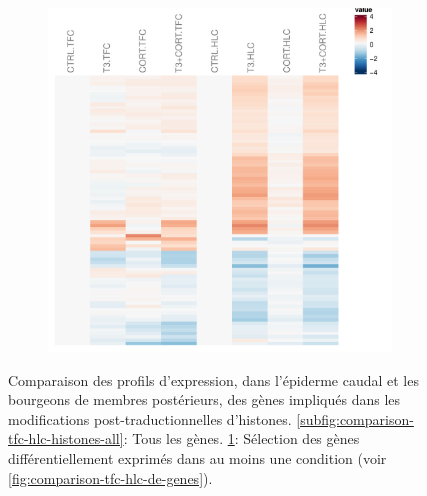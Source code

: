 \begin{figure}[!htbp]
\begin{subfigure}{0.495\textwidth}
	\includegraphics[width=\textwidth]
	{Figures/comparison-tfc-hlc-histones/comparison-tfc-hlc-histones-de.pdf}
	\caption{}
	\label{subfig:comparison-tfc-hlc-histones-de}
\end{subfigure}
\caption[Profils d'expression des gènes impliqués dans la modification d'histones]
{
Comparaison des profils d'expression, dans l'épiderme caudal et les bourgeons de membres postérieurs, des gènes impliqués dans les modifications post-traductionnelles d'histones.
\ref{subfig:comparison-tfc-hlc-histones-all}: Tous les gènes.
\ref{subfig:comparison-tfc-hlc-histones-de}: Sélection des gènes différentiellement exprimés dans au moins une condition (voir \autoref{fig:comparison-tfc-hlc-de-genes}).
}
\label{fig:comparison-tfc-hlc-histones}
%
\end{figure}
%
